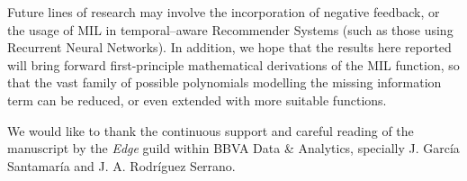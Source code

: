 \documentclass[sigconf]{acmart}
\begin{document}
Future lines of research may involve the incorporation of negative feedback, or the usage of \textsc{MIL} in temporal--aware Recommender Systems (such as those using Recurrent Neural Networks).  
In addition, we hope that the results here reported  will bring forward first-principle mathematical derivations of the \textsc{MIL} function, so that the vast family of possible polynomials modelling the missing information term can be reduced, or even extended with more suitable functions. 

\begin{acks}
We would like to thank the continuous support and careful reading of the manuscript by the \emph{Edge} guild within BBVA Data \& Analytics, specially J. Garc\'ia Santamar\'ia and J. A. Rodr\'iguez Serrano. 
\end{acks}

%

% 


\end{document}
